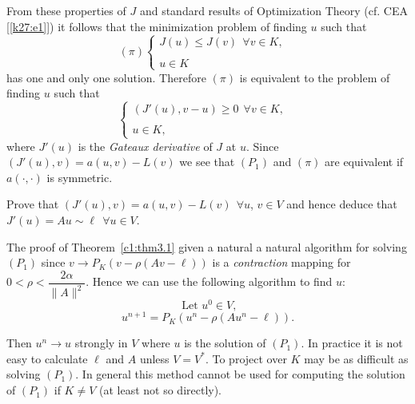 From these properties of $J$ and standard results of Optimization
Theory (cf. CEA [\ref{k27:e1}]) it follows that the minimization problem of finding
$u$ such that  
\begin{equation*}
(\pi) 
\begin{cases}
J(u) \leq J(v) ~~\forall v \in K, \\
&\\
u \in K
\end{cases}
\end{equation*}
has one and only one solution. Therefore $(\pi)$ is equivalent to the
problem of finding $u$ such that  
\begin{equation}
\begin{cases}
(J'(u), v - u) \geq 0 ~~\forall v \in K,\\
&\tag{3.11}\label{c1:eq3.11}\\
u \in K,
\end{cases}
\end{equation}
where $J'(u)$ is the \textit{Gateaux derivative} of $J$ at $u$. Since
$(J'(u),v) = a(u, v) - L(v)$ we see that $(P_1)$ and $(\pi)$ are
equivalent if $a(\cdot , \cdot)$ is symmetric. 

\begin{exercise}\label{c1:exer3.1}%
Prove that $(J'(u), v) =a (u, v) - L(v) ~~\forall u$, $v \in V$
and hence deduce that $J'(u) = Au \sim \ell ~~\forall u \in V$. 
\end{exercise}

\begin{remark}\label{c1:rem3.3}%
The proof of Theorem~\ref{c1:thm3.1} given a natural a natural algorithm for
solving $(P_1)$ since $v \to P_K(v - \rho (Av - \ell))$ is a
{\em contraction} mapping for $0 < \rho < \dfrac{2 \alpha}{\parallel A
  \parallel^2}$. 
Hence we can use the following algorithm to find $u$:
\begin{equation}
\text{ Let }u^0 \in V, \tag{3.12}\label{c1:eq3.12}
\end{equation}
\begin{equation}
u^{n+1} = P_K(u^n - \rho (Au^n - \ell)). \tag{3.13}\label{c1:eq3.13}
\end{equation}
\end{remark}

Then $u^n \to u$ strongly in $V$ where $u$ is the solution of
$(P_1)$. In practice it is not easy to calculate $\ell$ and $A$ unless
$V = V^*$. To project over $K$ may be as difficult as solving
$(P_1)$. In general this method cannot be used for computing the
solution of $(P_1)$ if $K \neq V$ (at least not so directly). 


